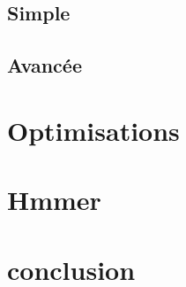 \subsection{Simple}
\subsection{Avancée}

\section{Optimisations}

\section{Hmmer}

\section{conclusion}
